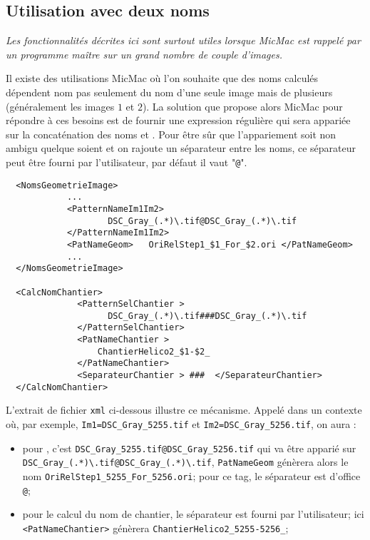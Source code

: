 \subsection{Utilisation avec deux noms}

\label{DU:Regex:CatNames}
\emph{Les fonctionnalit\'es d\'ecrites ici sont surtout utiles lorsque
MicMac est rappel\'e par un programme \emph{ma\^itre} sur un grand nombre
de couple d'images.}

Il existe des utilisations MicMac o\`u l'on souhaite que
des noms calcul\'es d\'ependent nom pas seulement du nom
d'une seule image mais de plusieurs (g\'en\'eralement
les images $1$ et $2$). La solution que propose alors
MicMac pour r\'epondre \`a ces besoins est de fournir
une expression r\'eguli\`ere qui sera appari\'ee sur la
concat\'enation des noms {\tt <Im1>} et {\tt <Im2>}.
Pour \^etre s\^ur que l'appariement soit non ambigu
quelque soient {\tt <Im1>} et {\tt <Im2>} on rajoute un
s\'eparateur  entre les noms, ce s\'eparateur peut \^etre
fourni par l'utilisateur, par d\'efaut il vaut "{\tt @}".


\begin{verbatim}
  <NomsGeometrieImage>
            ...
            <PatternNameIm1Im2>
                    DSC_Gray_(.*)\.tif@DSC_Gray_(.*)\.tif
            </PatternNameIm1Im2>
            <PatNameGeom>   OriRelStep1_$1_For_$2.ori </PatNameGeom>
            ...
  </NomsGeometrieImage>

  <CalcNomChantier>
              <PatternSelChantier >
                    DSC_Gray_(.*)\.tif###DSC_Gray_(.*)\.tif
              </PatternSelChantier>
              <PatNameChantier >
                  ChantierHelico2_$1-$2_
              </PatNameChantier>
              <SeparateurChantier > ###  </SeparateurChantier>
  </CalcNomChantier>

\end{verbatim}

L'extrait de fichier {\tt xml} ci-dessous illustre ce 
m\'ecanisme. Appel\'e dans un contexte
o\`u, par exemple, {\tt Im1=DSC\_Gray\_5255.tif} et  
{\tt Im2=DSC\_Gray\_5256.tif}, on aura :

\begin{itemize}
    \item pour {\tt <PatternNameIm1Im2>}, c'est 
         {\tt DSC\_Gray\_5255.tif@DSC\_Gray\_5256.tif}  qui
         va \^etre appari\'e sur {\tt\verb|DSC_Gray_(.*)\.tif@DSC_Gray_(.*)\.tif|},
         {\tt PatNameGeom} g\'en\`erera alors le nom 
         {\tt OriRelStep1\_5255\_For\_5256.ori}; pour ce tag, le s\'eparateur
         est d'office {\tt @};

    \item pour le calcul du nom de chantier, le s\'eparateur est fourni par
          l'utilisateur; ici {\tt <PatNameChantier>} g\'en\`erera
          {\tt ChantierHelico2\_5255-5256\_};
\end{itemize}



